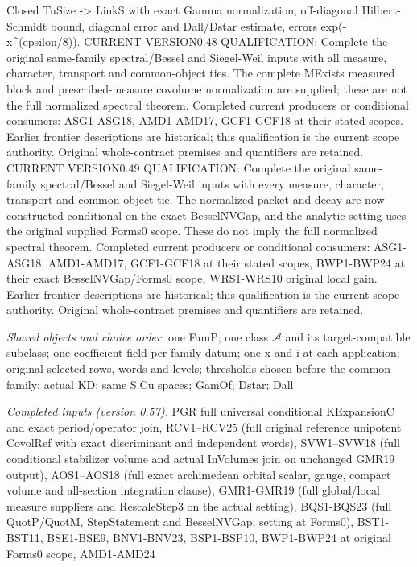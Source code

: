 \documentclass[11pt,a4paper]{article}
\numberwithin{equation}{section}
\theoremstyle{remark}\newtheorem{remark}[theorem]{Remark}
\begin{document}
Closed TuSize -> LinkS with exact Gamma normalization, off-diagonal Hilbert-Schmidt bound, diagonal error and Dall/Dstar estimate, errors exp(-x\textasciicircum{}(epsilon/8)). CURRENT VERSION0.48 QUALIFICATION: Complete the original same-family spectral/Bessel and Siegel-Weil inputs with all measure, character, transport and common-object ties. The complete MExists measured block and prescribed-measure covolume normalization are supplied; these are not the full normalized spectral theorem. Completed current producers or conditional consumers: ASG1-ASG18, AMD1-AMD17, GCF1-GCF18 at their stated scopes. Earlier frontier descriptions are historical; this qualification is the current scope authority. Original whole-contract premises and quantifiers are retained. CURRENT VERSION0.49 QUALIFICATION: Complete the original same-family spectral/Bessel and Siegel-Weil inputs with every measure, character, transport and common-object tie. The normalized packet and decay are now constructed conditional on the exact BesselNVGap, and the analytic setting uses the original supplied Forms0 scope. These do not imply the full normalized spectral theorem. Completed current producers or conditional consumers: ASG1-ASG18, AMD1-AMD17, GCF1-GCF18 at their stated scopes, BWP1-BWP24 at their exact BesselNVGap/Forms0 scope, WRS1-WRS10 original local gain. Earlier frontier descriptions are historical; this qualification is the current scope authority. Original whole-contract premises and quantifiers are retained.

\emph{Shared objects and choice order.} one FamP; one class $\mathcal A$ and its target-compatible subclass; one coefficient field per family datum; one x and i at each application; original selected rows, words and levels; thresholds chosen before the common family; actual KD; same S.Cu spaces; GamOf; Dstar; Dall

\emph{Completed inputs (version 0.57).} PGR full universal conditional KExpansionC and exact period/operator join, RCV1–RCV25 (full original reference unipotent CovolRef with exact discriminant and independent words), SVW1–SVW18 (full conditional stabilizer volume and actual InVolumes join on unchanged GMR19 output), AOS1–AOS18 (full exact archimedean orbital scalar, gauge, compact volume and all-section integration clause), GMR1-GMR19 (full global/local measure suppliers and RescaleStep3 on the actual setting), BQS1-BQS23 (full QuotP/QuotM, StepStatement and BesselNVGap; setting at Forms0), BST1-BST11, BSE1-BSE9, BNV1-BNV23, BSP1-BSP10, BWP1-BWP24 at original Forms0 scope, AMD1-AMD24
\end{document}

